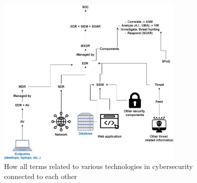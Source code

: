 \begin{figure}[htbp]
      \centering
      \includegraphics[width=0.8\textwidth]{Figures/XDR.jpg}
      \caption{How all terms related to various technologies in cybersecurity connected to each other}
      \label{fig:xdr}
\end{figure}

